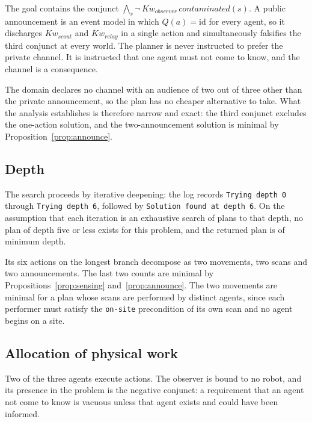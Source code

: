 \documentclass[11pt,a4paper]{article}
\theoremstyle{definition}
\newcommand{\Kw}[1]{\mathit{Kw}_{#1}}
\newcommand{\code}[1]{\texttt{\small #1}}
\begin{document}
The goal contains the conjunct
$\bigwedge_{s} \neg\,\Kw{\mathit{observer}}\,\mathit{contaminated}(s)$. A
public announcement is an event model in which $Q(a) = \mathrm{id}$ for every
agent, so it discharges $\Kw{\mathit{scout}}$ and $\Kw{\mathit{relay}}$ in a
single action and simultaneously falsifies the third conjunct at every world.
The planner is never instructed to prefer the private channel. It is
instructed that one agent must not come to know, and the channel is a
consequence.

The domain declares no channel with an audience of two out of three other than
the private announcement, so the plan has no cheaper alternative to take. What
the analysis establishes is therefore narrow and exact: the third conjunct
excludes the one-action solution, and the two-announcement solution is
minimal by Proposition~\ref{prop:announce}.

\subsection{Depth}

The search proceeds by iterative deepening: the log records
\code{Trying depth 0} through \code{Trying depth 6}, followed by
\code{Solution found at depth 6}. On the assumption that each iteration is an
exhaustive search of plans to that depth, no plan of depth five or less exists
for this problem, and the returned plan is of minimum depth.

Its six actions on the longest branch decompose as two movements, two scans and
two announcements. The last two counts are minimal by
Propositions~\ref{prop:sensing} and~\ref{prop:announce}. The two movements are
minimal for a plan whose scans are performed by distinct agents, since each
performer must satisfy the \code{on-site} precondition of its own scan and no
agent begins on a site.

\subsection{Allocation of physical work}

Two of the three agents execute actions. The observer is bound to no robot,
and its presence in the problem is the negative conjunct: a requirement that an
agent not come to know is vacuous unless that agent exists and could have been
informed.
\end{document}
